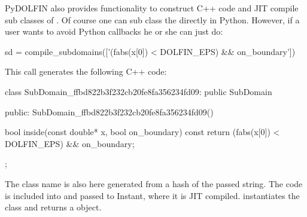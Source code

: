 PyDOLFIN also provides functionality to construct C++ code and JIT compile sub classes of . Of course one can sub class the  directly in Python. However, if a user wants to avoid Python callbacks he or she can just do:
\begin{python}
sd = compile_subdomains(['(fabs(x[0]) < DOLFIN_EPS) && on_boundary'])
\end{python}
This call generates the following C++ code:
\begin{c++}
class SubDomain_ffbd822b3f232cb20fe8fa356234fd09: public SubDomain
{
public:
  SubDomain_ffbd822b3f232cb20fe8fa356234fd09(){}

  bool inside(const double* x, bool on_boundary) const{
      return (fabs(x[0]) < DOLFIN_EPS) && on_boundary;
  }
};
\end{c++}
The class name is also here generated from a hash of the passed string. The code is included into  and passed to Instant, where it is JIT compiled.  instantiates the class and returns a  object.

%
%
%

